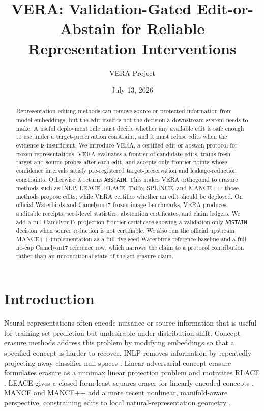 \documentclass[10pt]{article}
\title{VERA: Validation-Gated Edit-or-Abstain for Reliable Representation Interventions}
\author{VERA Project}
\date{July 13, 2026}
\begin{document}
\sloppy
{}
\maketitle

\begin{abstract}
Representation editing methods can remove source or protected information from
model embeddings, but the edit itself is not the decision a downstream system
needs to make. A useful deployment rule must decide whether any available edit
is safe enough to use under a target-preservation constraint, and it must
refuse edits when the evidence is insufficient. We introduce VERA, a certified
edit-or-abstain protocol for frozen representations. VERA evaluates a frontier
of candidate edits, trains fresh target and source probes after each edit, and
accepts only frontier points whose confidence intervals satisfy pre-registered
target-preservation and leakage-reduction constraints. Otherwise it returns
\texttt{ABSTAIN}. This makes VERA orthogonal to erasure methods such as INLP,
LEACE, RLACE, TaCo, SPLINCE, and MANCE++: those methods propose edits, while
VERA certifies whether an edit should be deployed. On official Waterbirds and
Camelyon17 frozen-image benchmarks, VERA produces auditable receipts,
seed-level statistics, abstention certificates, and claim ledgers. We add a
full Camelyon17 projection-frontier certificate showing a validation-only
\texttt{ABSTAIN} decision when source reduction is not certifiable. We also run
the official upstream MANCE++ implementation as a full five-seed Waterbirds
reference baseline and a full no-cap Camelyon17 reference row, which narrows
the claim to a protocol contribution rather than an unconditional
state-of-the-art erasure claim.
\end{abstract}

\section{Introduction}

Neural representations often encode nuisance or source information that is
useful for training-set prediction but undesirable under distribution shift.
Concept-erasure methods address this problem by modifying embeddings so that a
specified concept is harder to recover. INLP removes information by repeatedly
projecting away classifier null spaces \cite{ravfogel2020inlp}. Linear
adversarial concept erasure formulates erasure as a minimax linear projection
problem and motivates RLACE \cite{ravfogel2022lace}. LEACE gives a closed-form
least-squares eraser for linearly encoded concepts \cite{belrose2023leace}.
MANCE and MANCE++ add a more recent nonlinear, manifold-aware perspective,
constraining edits to local natural-representation geometry \cite{avitan2026mance}.
\end{document}
